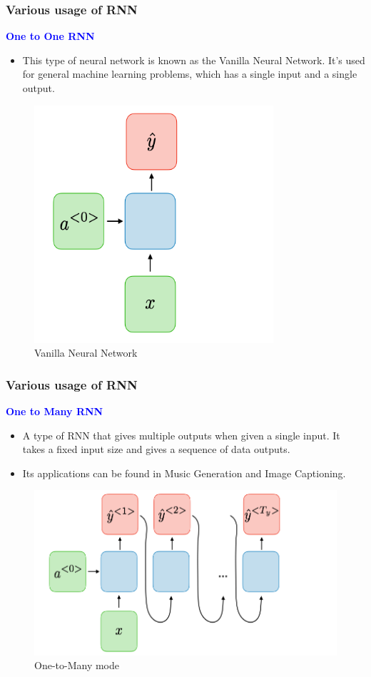 \documentclass[
	11pt,
]{beamer}
\begin{document}
\begin{frame}
	\frametitle{Various usage of RNN}
	\large{\textcolor{blue}{\textbf{One to One RNN}}}
	\begin{itemize}
		\item This type of neural network is known as the Vanilla Neural Network. It's used for general machine learning problems, which has a single input and a single output.
	\end{itemize}
	\begin{figure}[h]
		\centering
		\includegraphics[scale=0.5]{Images/one_to_one.png}
		\caption{Vanilla Neural Network}
	\end{figure}
\end{frame}

\begin{frame}
	\frametitle{Various usage of RNN}
	\large{\textcolor{blue}{\textbf{One to Many RNN}}}
	\begin{itemize}
		\item A type of RNN that gives multiple outputs when given a single input. It takes a fixed input size and gives a sequence of data outputs.
		\item Its applications can be found in Music Generation and Image Captioning.
	\end{itemize}
	\begin{figure}[h]
		\centering
		\includegraphics[scale=0.5]{Images/one_to_many.png}
		\caption{One-to-Many mode}
	\end{figure}
\end{frame}
\end{document}

